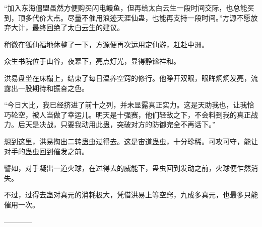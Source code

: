 \begin{this_body}
“加入东海僵盟虽然方便购买闪电鳗鱼，但再给太白云生一段时间交际，也总能买到，顶多代价大点。尽量不催用浪迹天涯仙蛊，也能再支持一段时间。”方源不愿放弃大计，最终回绝了太白云生的建议。

稍微在狐仙福地休整了一下，方源便再次运用定仙游，赶赴中洲。

众生书院位于山谷，夜幕下，亮点灯光，显得静谧祥和。

洪易盘坐在床榻上，结束了每日温养空窍的修行。他睁开双眼，眼眸炯炯发亮，流露出一股期待和振奋之色。

“今日大比，我已经挤进了前十之列，并未显露真正实力。这是天助我也，让我恰巧轮空，被人当做了幸运儿。明天是十强赛，他们轻敌之下，不会料到我的真正战力。后天是决战，只要我动用此蛊，突破对方的防御完全不再话下。”

想到这里，洪易掏出二转蛊虫过得去。这是宙道蛊虫，十分珍稀。可攻可守，能让对手的蛊虫回到催发之前。

譬如，对手凝出一道火球，在过得去的威能下，蛊虫回到发动之前，火球便乍然消失。

不过，过得去蛊对真元的消耗极大，凭借洪易上等空窍，九成多真元，也最多只能催用一次。

------------

\end{this_body}

